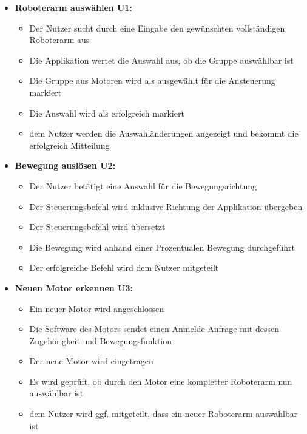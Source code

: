 \begin{itemize}
	\item \textbf{Roboterarm auswählen U1:}\\
	\begin{itemize}
		\item Der Nutzer sucht durch eine Eingabe den gewünschten vollständigen Roboterarm aus
		\item Die Applikation wertet die Auswahl aus, ob die Gruppe auswählbar ist
		\item Die Gruppe aus Motoren wird als ausgewählt für die Ansteuerung markiert
		\item Die Auswahl wird als erfolgreich markiert
		\item dem Nutzer werden die Auswahländerungen angezeigt und bekommt die erfolgreich Mitteilung
	\end{itemize}
	
	\item \textbf{Bewegung auslösen U2:}\\
	\begin{itemize}
		\item Der Nutzer betätigt eine Auswahl für die Bewegungsrichtung
		\item Der Steuerungsbefehl wird inklusive Richtung der Applikation übergeben
		\item Der Steuerungsbefehl wird übersetzt
		\item Die Bewegung wird anhand einer Prozentualen Bewegung durchgeführt
		\item Der erfolgreiche Befehl wird dem Nutzer mitgeteilt
	\end{itemize}
	
	
	\item \textbf{Neuen Motor erkennen U3:}\\
	\begin{itemize}
		\item Ein neuer Motor wird angeschlossen
		\item Die Software des Motors sendet einen Anmelde-Anfrage mit dessen Zugehörigkeit und Bewegungsfunktion
		\item Der neue Motor wird eingetragen
		\item Es wird geprüft, ob durch den Motor eine kompletter Roboterarm nun auswählbar ist
		\item dem Nutzer wird ggf. mitgeteilt, dass ein neuer Roboterarm auswählbar ist
	\end{itemize}
	

\end{itemize}
